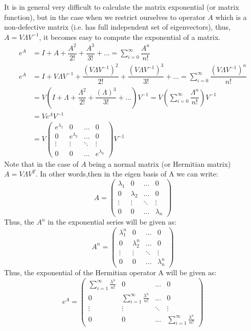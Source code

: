 \documentclass[12pt, oneside]{book}
\theoremstyle{definition}
\theoremstyle{definition}
\theoremstyle{remark}
\begin{document}
It is in general very difficult to calculate the matrix exponential (or matrix function), but in the case when we restrict ourselves to operator $A$ which is a non-defective matrix (i.e. has full independent set of eigenvectors), thus, $A=V\Lambda V^{-1}$, it becomes easy to compute the exponential of a matrix.
\begin{align*} 
e^A&=I+A+\dfrac{A^2}{2!}+\dfrac{A^3}{3!}+\ldots = \sum_{i=0}^{\infty} \dfrac{A^n}{n!}\\
e^A&=I+V\Lambda V^{-1} +\dfrac{(V\Lambda V^{-1})^2}{2!}+ \dfrac{(V\Lambda V^{-1})^3}{3!}+\ldots = \sum_{i=0}^{\infty} \dfrac{(V\Lambda V^{-1})^n}{n!}\\
&=V\left(I+\Lambda + \dfrac{\Lambda^2}{2!}+\dfrac{(\Lambda)^3}{3!}+\ldots\right)V^{-1} = V\left(\sum_{i=0}^{\infty} \dfrac{\Lambda^n}{n!}\right)V^{-1}\\
&=Ve^{\Lambda}V^{-1}\\
&=V\begin{pmatrix} e^{\lambda_1} & 0 & \ldots & 0 \\ 0 & e^{\lambda_2} & \ldots & 0 \\ \vdots & \vdots & \ddots & \vdots \\ 0 & 0 & \ldots & e^{\lambda_n} \end{pmatrix} V^{-1} 
\end{align*}
Note that  in the case of $A$ being a normal matrix (or Hermitian matrix) $A=V\Lambda V^T$.
In other words,then in the eigen basis of A we can write: 
\[ A=\begin{pmatrix} \lambda_1 & 0 & \ldots & 0 \\ 0 & \lambda_2 & \ldots & 0 \\ \vdots & \vdots & \ddots & \vdots \\ 0 & 0 & \ldots & \lambda_n \end{pmatrix} \]
Thus, the $A^n$ in the exponential series will be given as:
\[ A^n=\begin{pmatrix} \lambda_1^n & 0 & \ldots & 0 \\ 0 & \lambda_2^n & \ldots & 0 \\ \vdots & \vdots & \ddots & \vdots \\ 0 & 0 & \ldots & \lambda_n^n \end{pmatrix} \]
Thus, the exponential of the Hermitian operator A will be given as:
\[ e^A=\begin{pmatrix} \sum_{i=1}^{\infty} \frac{\lambda^n}{n!} & 0 & \ldots & 0 \\ 0 & \sum_{i=1}^{\infty} \frac{\lambda^n}{n!} & \ldots & 0 \\ \vdots & \vdots & \ddots & \vdots \\ 0 & 0 & \ldots & \sum_{i=1}^{\infty} \frac{\lambda^n}{n!} \end{pmatrix} \]
\end{document}
